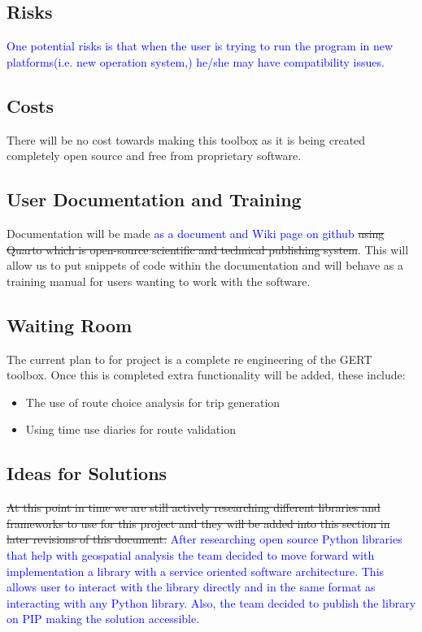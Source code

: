 \documentclass[12pt, titlepage]{article}
\begin{document}
\subsection{Risks}
\textcolor{blue}{
One potential risks is that when the user is trying to run the program in new platforms(i.e. new operation system,) he/she
may have compatibility issues.}
\subsection{Costs}
There will be no cost towards making this  toolbox as it is being created completely open source and free from proprietary software.
\subsection{User Documentation and Training}
Documentation will be made \textcolor{blue}{as a document and Wiki page on github} \sout{using Quarto which is open-source scientific and technical publishing system}. This will allow us to put snippets of code within the documentation and will behave as a training manual for users wanting to work with the software. 
\subsection{Waiting Room}
The current plan to for project is a complete re engineering of the GERT toolbox. Once this is completed extra functionality will be added, these include: 
\begin{itemize}
    \item The use of route choice analysis for trip generation 
    \item Using time use diaries for route validation 
\end{itemize}
\subsection{Ideas for Solutions}
\sout{At this point in time we are still actively researching different libraries and frameworks to use for this project and they will be added into this section in later revisions of this document.} \textcolor{blue}{After researching open source Python libraries that help with geospatial analysis the team decided to move forward with implementation a library with a service oriented software architecture. This allows user to interact with the library directly and in the same format as interacting with any Python library. Also, the team decided to publish the library on PIP making the solution accessible. } 
\end{document}
